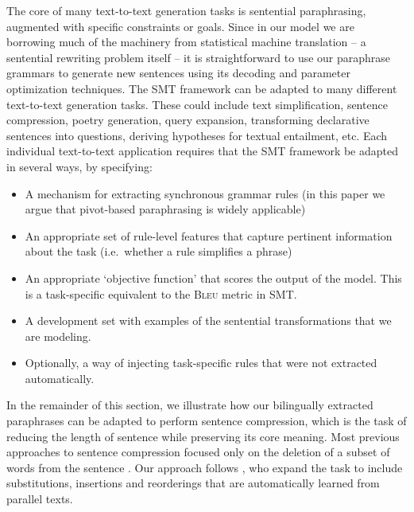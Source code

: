 \documentclass[11pt]{article}
\begin{document}
The core of many text-to-text generation tasks is sentential
paraphrasing, augmented with specific constraints or goals. Since in
our model we are borrowing much of the machinery from statistical
machine translation -- a sentential rewriting problem itself -- it is
straightforward to use our paraphrase grammars to generate new
sentences using its decoding and parameter optimization
techniques. The SMT framework can be adapted to many different
text-to-text generation tasks.  These could include text
simplification, sentence compression, poetry generation, query
expansion, transforming declarative sentences into questions, deriving
hypotheses for textual entailment, etc.  Each individual text-to-text
application requires that the SMT framework be adapted in several
ways, by specifying:
\begin{itemize}
\item A mechanism for extracting synchronous grammar rules (in this
  paper we argue that pivot-based paraphrasing is widely applicable)
\item An appropriate set of rule-level features that capture pertinent
  information about the task (i.e.\ whether a rule simplifies a
  phrase)
\item An appropriate `objective function' that scores the output of
  the model.  This is a task-specific equivalent to the \textsc{Bleu}
  metric \cite{Papineni2002} in SMT.
\item A development set with examples of the sentential
  transformations that we are modeling.
\item Optionally, a way of injecting task-specific rules that were not
  extracted automatically.
\end{itemize} 
In the remainder of this section, we illustrate how our bilingually
extracted paraphrases can be adapted to perform sentence compression,
which is the task of reducing the length of sentence while preserving
its core meaning.  Most previous approaches to sentence compression
focused only on the deletion of a subset of words from the sentence
\cite{KnightMarcuAI02}.  Our approach follows
, who expand the task to include
substitutions, insertions and reorderings that are automatically
learned from parallel texts.
\end{document}

